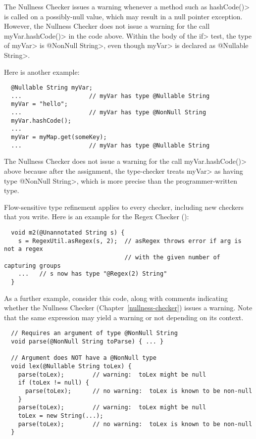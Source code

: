 \noindent
The Nullness Checker issues a warning whenever a method such as
\<hashCode()> is called on a possibly-null value, which  may result in a
null pointer exception.
However, the Nullness Checker does not issue a warning for the call
\<myVar.hashCode()>
in the code above.
Within the body
of the \<if> test, the type of \<myVar> is \<@NonNull String>, even though
\<myVar> is declared as \<@Nullable String>.

Here is another example:

\begin{Verbatim}
  @Nullable String myVar;
  ...                   // myVar has type @Nullable String
  myVar = "hello";
  ...                   // myVar has type @NonNull String
  myVar.hashCode();
  ...
  myVar = myMap.get(someKey);
  ...                   // myVar has type @Nullable String
\end{Verbatim}

\noindent
The Nullness Checker does not issue a warning for
the call \<myVar.hashCode()> above because after the assignment,
the type-checker
treats \<myVar> as having type \<@NonNull String>, which is more precise
than the programmer-written type.


Flow-sensitive type refinement applies to every checker, including new
checkers that you write.  Here is an example for the Regex Checker
():

\begin{Verbatim}
  void m2(@Unannotated String s) {
    s = RegexUtil.asRegex(s, 2);  // asRegex throws error if arg is not a regex
                                  // with the given number of capturing groups
    ...   // s now has type "@Regex(2) String"
  }
\end{Verbatim}


As a further example,
consider this code, along with comments indicating whether the
Nullness Checker (Chapter~\ref{nullness-checker}) issues a warning.  Note that the same expression may yield a
warning or not depending on its context.

\begin{Verbatim}
  // Requires an argument of type @NonNull String
  void parse(@NonNull String toParse) { ... }

  // Argument does NOT have a @NonNull type
  void lex(@Nullable String toLex) {
    parse(toLex);        // warning:  toLex might be null
    if (toLex != null) {
      parse(toLex);      // no warning:  toLex is known to be non-null
    }
    parse(toLex);        // warning:  toLex might be null
    toLex = new String(...);
    parse(toLex);        // no warning:  toLex is known to be non-null
  }
\end{Verbatim}

